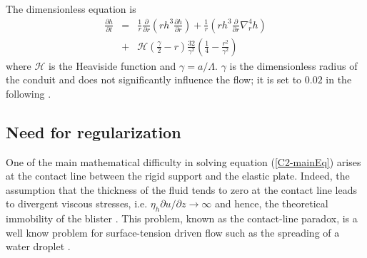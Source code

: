 The dimensionless equation is
\begin{eqnarray}
  \frac{\partial h}{\partial t}& =&\frac{1}{ r}
                                    \frac{\partial}{\partial r}  \left( rh^3  \frac{\partial h}{\partial
                                    r}\right)+\frac{1}{ r} \left( rh^3
                                    \frac{\partial}{\partial
                                    r}\nabla_r^4h\right)\nonumber\\
                               &+&
                                   \mathcal{H}(\frac{\gamma}{2}-r)\frac{32}{\gamma^{2}}\left(\frac{1}{4}-\frac{r^{2}}{\gamma^{2}}\right)
                                   \label{C2-mainEq}
\end{eqnarray}
where $\mathcal{H}$ is the  Heaviside function and $\gamma=a/\Lambda$.
$\gamma$  is the  dimensionless radius  of  the conduit  and does  not
significantly influence the flow; it is set to $0.02$ in the following
\citep{Michaut:2009jx,Michaut:2011kg}.
	 
\subsection{Need for regularization}
\label{C2-sec:need-regularization}

One  of   the  main   mathematical  difficulty  in   solving  equation
(\ref{C2-mainEq}) arises at the contact line between the rigid support
and the elastic  plate.  Indeed, the assumption that  the thickness of
the fluid tends to zero at the contact line leads to divergent viscous
stresses, i.e.   $\eta_h \partial u/\partial z\rightarrow  \infty$ and
hence,     the    theoretical     immobility     of    the     blister
\citep{Flitton:1999iv,Lister:2013ia,Anonymous:QWXp_4JV}. This problem,
known  as  the  contact-line  paradox,  is a  well  know  problem  for
surface-tension driven flow  such as the spreading of  a water droplet
\citep{Bertozzi:1998wz,Snoeijer:2013cm}.

